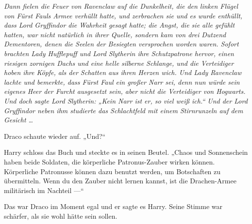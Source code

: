 \emph{Dann fielen die Feuer von Ravenclaw auf die Dunkelheit, die den linken Flügel von Fürst Fauls Armee verhüllt hatte, und zerbrachen sie und es wurde enthüllt, dass Lord Gryffindor die Wahrheit gesagt hatte; die Angst, die sie alle gefühlt hatten, war nicht natürlich in ihrer Quelle, sondern kam von drei Dutzend Dementoren, denen die Seelen der Besiegten versprochen worden waren. Sofort brachten Lady Hufflepuff und Lord Slytherin ihre Schutzpatrone hervor, einen riesigen zornigen Dachs und eine helle silberne Schlange, und die Verteidiger hoben ihre Köpfe, als der Schatten aus ihren Herzen wich. Und Lady Ravenclaw lachte und bemerkte, dass Fürst Faul ein großer Narr sei, denn nun würde sein eigenes Heer der Furcht ausgesetzt sein, aber nicht die Verteidiger von Hogwarts. Und doch sagte Lord Slytherin:
„Kein Narr ist er, so viel weiß ich.“ Und der Lord Gryffindor neben ihm studierte das Schlachtfeld mit einem Stirnrunzeln auf dem Gesicht …}

Draco schaute wieder auf.
„Und?“

Harry schloss das Buch und steckte es in seinen Beutel.
„Chaos und Sonnenschein haben beide Soldaten, die körperliche Patronus-Zauber wirken können. Körperliche Patronusse können dazu benutzt werden, um Botschaften zu übermitteln. Wenn du den Zauber nicht lernen kannst, ist die Drachen-Armee militärisch im Nachteil —“

Das war Draco im Moment egal und er sagte es Harry. Seine Stimme war schärfer, als sie wohl hätte sein sollen.

